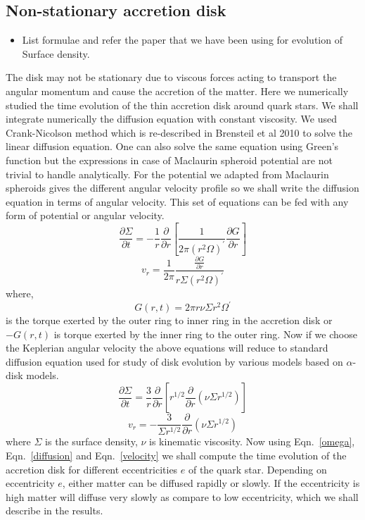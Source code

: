 \documentclass[useAMS,usenatbib]{mn2e}
\begin{document}
\subsection{Non-stationary accretion disk}
\begin{itemize}
\item List formulae and refer the paper that we have been using for
  evolution of Surface density. 
\end{itemize}
The disk may not be stationary due to viscous forces acting to transport the angular momentum and cause the accretion of the matter. Here we numerically studied the time evolution of the thin accretion disk around quark stars. We shall integrate numerically the diffusion equation with constant viscosity. We used Crank-Nicolson method which is re-described in Brensteil et al 2010 to solve the linear diffusion equation. One can also solve the same equation using Green's function but the expressions in case of Maclaurin spheroid potential are not trivial to handle analytically. For the potential we adapted from Maclaurin spheroids gives the different angular velocity profile so we shall write the diffusion equation in terms of angular velocity. This set of equations can be fed with any form of potential or angular velocity.
\begin{equation}
\frac{\partial\Sigma}{\partial t} = -\frac{1}{r}\frac{\partial}{\partial r}\left[\frac{1}{2\pi(r^2\Omega)^\prime}\frac{\partial G}{\partial r}\right]
\label{diffusion}
\end{equation}
\begin{equation}
v_r = \frac{1}{2\pi}\frac{\frac{\partial G}{\partial r}}{r\Sigma (r^2\Omega)^\prime}
\label{velocity}
\end{equation}
where,
\begin{equation}
G(r,t) = 2\pi r\nu\Sigma r^2 \Omega^\prime 
\end{equation}
is the torque exerted by the outer ring to inner ring in the accretion disk or $-G(r,t)$ is torque exerted by the inner ring to the outer ring. Now if we choose the Keplerian angular velocity the above equations will reduce to standard diffusion equation used for study of disk evolution by various models based on $\alpha$-disk models.
\begin{equation}
\frac{\partial\Sigma}{\partial t} = \frac{3}{r}\frac{\partial}{\partial r}\left[r^{1/2}\frac{\partial}{\partial r}\left(\nu\Sigma r^{1/2}\right)\right]
\end{equation}
\begin{equation}
v_r = -\frac{3}{\Sigma r^{1/2}}\frac{\partial}{\partial r}\left(\nu\Sigma r^{1/2}\right)
\end{equation}
where $\Sigma$ is the surface density, $\nu$ is kinematic viscosity. Now using Eqn.~\ref{omega}, Eqn.~\ref{diffusion} and Eqn.~\ref{velocity} we shall compute the time evolution of the accretion disk for different eccentricities $e$ of the quark star. Depending on eccentricity $e$, either matter can be diffused rapidly or slowly. If the eccentricity is high matter will diffuse very slowly as compare to low eccentricity, which we shall describe in the results.
\end{document}
